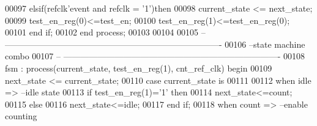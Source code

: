 \begin{DoxyCode}
00097     \textcolor{keywordflow}{elsif}\textcolor{vhdlchar}{(}\textcolor{vhdlchar}{refclk}\textcolor{vhdlchar}{'}\textcolor{vhdlkeyword}{event} \textcolor{keywordflow}{and} \textcolor{vhdlchar}{refclk} \textcolor{vhdlchar}{=} \textcolor{vhdlchar}{'}\textcolor{vhdllogic}{}\textcolor{vhdllogic}{1}\textcolor{vhdlchar}{'}\textcolor{vhdlchar}{)}\textcolor{keywordflow}{then} 
00098         \textcolor{vhdlchar}{current_state} \textcolor{vhdlchar}{<=} \textcolor{vhdlchar}{next_state};
00099         \textcolor{vhdlchar}{test_en_reg}\textcolor{vhdlchar}{(}\textcolor{vhdllogic}{}\textcolor{vhdllogic}{0}\textcolor{vhdlchar}{)}\textcolor{vhdlchar}{<=}\textcolor{vhdlchar}{test_en};
00100         \textcolor{vhdlchar}{test_en_reg}\textcolor{vhdlchar}{(}\textcolor{vhdllogic}{}\textcolor{vhdllogic}{1}\textcolor{vhdlchar}{)}\textcolor{vhdlchar}{<=}\textcolor{vhdlchar}{test_en_reg}\textcolor{vhdlchar}{(}\textcolor{vhdllogic}{}\textcolor{vhdllogic}{0}\textcolor{vhdlchar}{)};
00101     \textcolor{keywordflow}{end} \textcolor{keywordflow}{if}; 
00102 \textcolor{keywordflow}{end} \textcolor{keywordflow}{process};
00103 
00104 
00105 \textcolor{keyword}{-- ----------------------------------------------------------------------------}
00106 \textcolor{keyword}{--state machine combo}
00107 \textcolor{keyword}{-- ----------------------------------------------------------------------------}
00108 fsm : \textcolor{keywordflow}{process}(current_state, test_en_reg(\textcolor{vhdllogic}{1}), cnt_ref_clk) \textcolor{keywordflow}{begin}
00109     \textcolor{vhdlchar}{next_state} \textcolor{vhdlchar}{<=} \textcolor{vhdlchar}{current_state};
00110     \textcolor{keywordflow}{case} \textcolor{vhdlchar}{current_state} \textcolor{keywordflow}{is}
00111       
00112         \textcolor{keywordflow}{when} \textcolor{vhdlchar}{idle} \textcolor{vhdlchar}{=}\textcolor{vhdlchar}{>}\textcolor{keyword}{                    --idle state}
00113             \textcolor{keywordflow}{if} \textcolor{vhdlchar}{test_en_reg}\textcolor{vhdlchar}{(}\textcolor{vhdllogic}{}\textcolor{vhdllogic}{1}\textcolor{vhdlchar}{)}\textcolor{vhdlchar}{=}\textcolor{vhdlchar}{'}\textcolor{vhdllogic}{}\textcolor{vhdllogic}{1}\textcolor{vhdlchar}{'} \textcolor{keywordflow}{then} 
00114                 \textcolor{vhdlchar}{next_state}\textcolor{vhdlchar}{<=}\textcolor{vhdlchar}{count};
00115             \textcolor{keywordflow}{else} 
00116                 \textcolor{vhdlchar}{next_state}\textcolor{vhdlchar}{<=}\textcolor{vhdlchar}{idle};
00117             \textcolor{keywordflow}{end} \textcolor{keywordflow}{if};
00118         \textcolor{keywordflow}{when} \textcolor{vhdlchar}{count} \textcolor{vhdlchar}{=}\textcolor{vhdlchar}{>}\textcolor{keyword}{                   --enable counting}

\end{DoxyCode}
